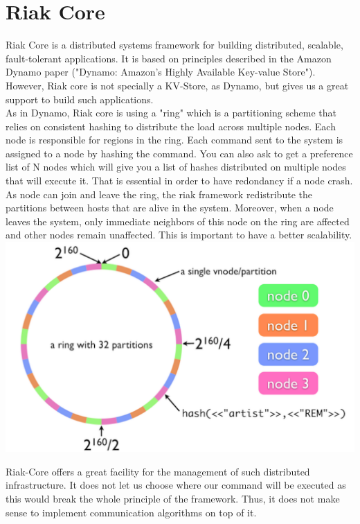 \documentclass[a4paper, 11pt]{article}
\begin{document}
\section{Riak Core}

Riak Core is a distributed systems framework for building distributed, scalable, fault-tolerant applications.
It is based on principles described in the Amazon Dynamo paper ("Dynamo: Amazon’s Highly Available Key-value Store").
However, Riak core is not specially a KV-Store, as Dynamo, but gives us a great support to build such applications. \\

As in Dynamo, Riak core is using a "ring" which is a partitioning scheme that relies on consistent hashing to distribute the load across multiple nodes.
Each node is responsible for regions in the ring.
Each command sent to the system is assigned to a node by hashing the command.
You can also ask to get a preference list of N nodes which will give you a list of hashes distributed on multiple nodes that will execute it.
That is essential in order to have redondancy if a node crash.
As node can join and leave the ring, the riak framework redistribute the partitions between hosts that are alive in the system.
Moreover, when a node leaves the system, only immediate neighbors of this node on the ring are affected and other nodes remain unaffected.
This is important to have a better scalability.\\

\includegraphics[width=\linewidth]{ring.png}

\newpage
Riak-Core offers a great facility for the management of such distributed infrastructure.
It does not let us choose where our command will be executed as this would break the whole principle of the framework.
Thus, it does not make sense to implement communication algorithms on top of it. \\
\end{document}
